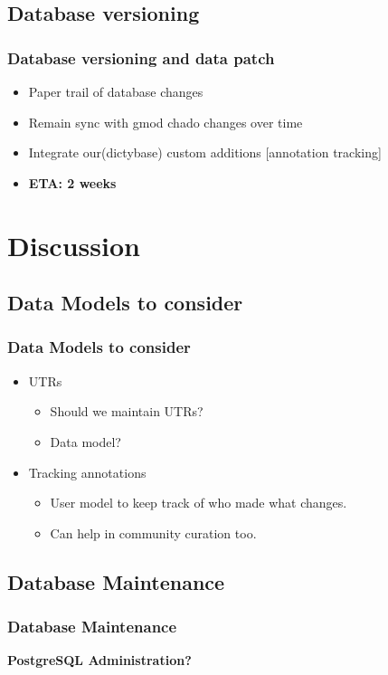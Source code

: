 \documentclass[hyperref={pdfpagelabels=false}, compress]{beamer}
\begin{document}
\subsection{Database versioning}
\begin{frame}
  \frametitle{Database versioning and data patch}
  \begin{itemize}
      \item Paper trail of database changes
      \item Remain sync with gmod chado changes over time
      \item Integrate our(dictybase) custom additions [annotation tracking]
      \item \textbf{ETA: 2 weeks}
  \end{itemize}
\end{frame}

\section{Discussion}
\subsection{Data Models to consider}
\begin{frame}
    \frametitle{Data Models to consider}
	\begin{itemize}
		\item UTRs
		\begin{itemize}
			\item Should we maintain UTRs?
			\item Data model?
		\end{itemize}
		\item Tracking annotations
		\begin{itemize}
			\item User model to keep track of who made what changes. 
			\item Can help in community curation too.
		\end{itemize}
	\end{itemize}        
\end{frame}

\subsection{Database Maintenance}
\begin{frame}
   \frametitle{Database Maintenance}
   \begin{center}
   		\textbf{\Large PostgreSQL Administration?}
   	\end{center}
\end{frame}

\end{document}
